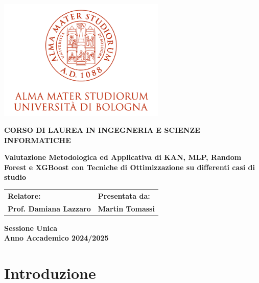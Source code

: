 \documentclass[a4paper,12pt]{report}
\begin{document}
	
	\begin{titlepage}
		\begin{center}
			\includegraphics[width=0.6\textwidth]{img/logo_unibo.png}
		\end{center}
		\begin{center}
			\vspace{2cm}
			\textbf{CORSO DI LAUREA IN INGEGNERIA E SCIENZE INFORMATICHE}
			
			\vspace{2cm}
			\textbf{\Large Valutazione Metodologica ed Applicativa di KAN, MLP, Random Forest e XGBoost con Tecniche di Ottimizzazione su differenti casi di studio}
			
			\vspace{2cm}
			\begin{tabular}{p{0.8\textwidth} p{}}
				\textbf{Relatore:} & \textbf{Presentata da:} \\
				\textbf{Prof. Damiana Lazzaro} & \textbf{Martin Tomassi} \\
			\end{tabular}
			
			\vspace{2cm}
			\textbf{Sessione Unica} \\
			\textbf{Anno Accademico 2024/2025}
		\end{center}
	\end{titlepage}
	
	\tableofcontents
		
	\chapter*{Introduzione}
	
\end{document}

